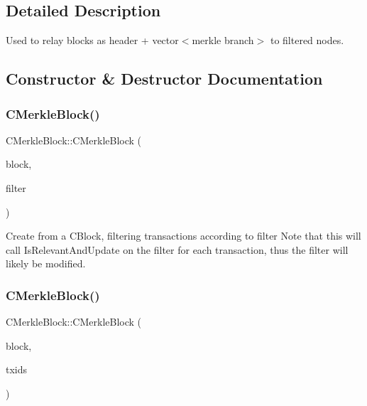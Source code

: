 \subsection{Detailed Description}
Used to relay blocks as header + vector$<$merkle branch$>$ to filtered nodes. 

\subsection{Constructor \& Destructor Documentation}
\mbox{\label{class_c_merkle_block_a5d08ce7034216ca25b0f9eab6bf8c389}} 
\subsubsection{\texorpdfstring{C\+Merkle\+Block()}{CMerkleBlock()}\hspace{0.1cm}{\footnotesize\ttfamily [1/3]}}
{\footnotesize\ttfamily C\+Merkle\+Block\+::\+C\+Merkle\+Block (\begin{DoxyParamCaption}\item[{const C\+Block \&}]{block,  }\item[{\mbox{\hyperlink{class_c_bloom_filter}{C\+Bloom\+Filter}} \&}]{filter }\end{DoxyParamCaption})}

Create from a C\+Block, filtering transactions according to filter Note that this will call Is\+Relevant\+And\+Update on the filter for each transaction, thus the filter will likely be modified. \mbox{\label{class_c_merkle_block_a720f9e78e80b415cf6b607b189eec31b}} 
\subsubsection{\texorpdfstring{C\+Merkle\+Block()}{CMerkleBlock()}\hspace{0.1cm}{\footnotesize\ttfamily [2/3]}}
{\footnotesize\ttfamily C\+Merkle\+Block\+::\+C\+Merkle\+Block (\begin{DoxyParamCaption}\item[{const C\+Block \&}]{block,  }\item[{const std\+::set$<$ \mbox{\hyperlink{classuint256}{uint256}} $>$ \&}]{txids }\end{DoxyParamCaption})}

